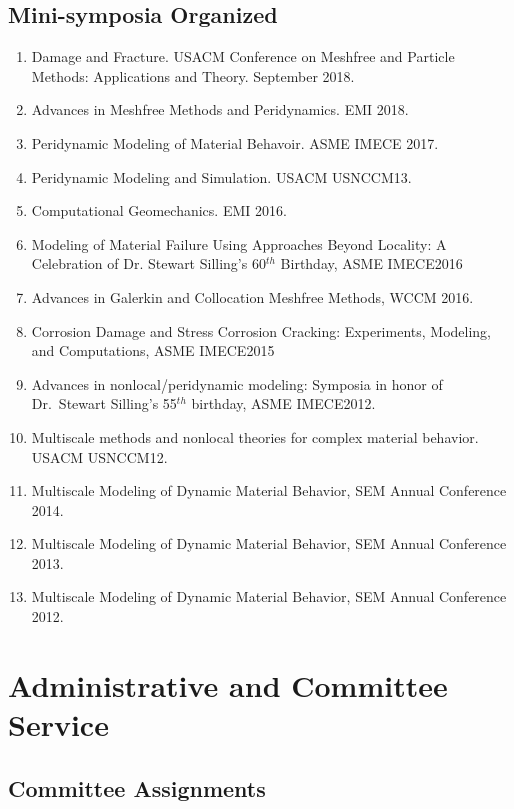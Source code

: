 \subsection*{Mini-symposia Organized}

\begin{enumerate}
    \item Damage and Fracture. USACM Conference on Meshfree and Particle Methods: Applications and Theory. September 2018.
    \item Advances in Meshfree Methods and Peridynamics. EMI 2018.
    \item Peridynamic Modeling of Material Behavoir. ASME IMECE 2017.
    \item Peridynamic Modeling and Simulation. USACM USNCCM13.
    \item Computational Geomechanics. EMI 2016.
    \item Modeling of Material Failure Using Approaches Beyond Locality: A Celebration of Dr. Stewart Silling's 60$^{th}$ Birthday, ASME IMECE2016
    \item Advances in Galerkin and Collocation Meshfree Methods, WCCM 2016.
    \item Corrosion Damage and Stress Corrosion Cracking: Experiments, Modeling, and Computations, ASME IMECE2015
    \item Advances in nonlocal/peridynamic modeling: Symposia in honor of Dr.~Stewart Silling's 55$^{th}$ birthday, ASME IMECE2012.
    \item Multiscale methods and nonlocal theories for complex material behavior. USACM USNCCM12.
    \item Multiscale Modeling of Dynamic Material Behavior, SEM Annual Conference 2014.
    \item Multiscale Modeling of Dynamic Material Behavior, SEM Annual Conference 2013.
    \item Multiscale Modeling of Dynamic Material Behavior, SEM Annual Conference 2012.
\end{enumerate}

\section*{Administrative and Committee Service}
\subsection*{Committee Assignments}
